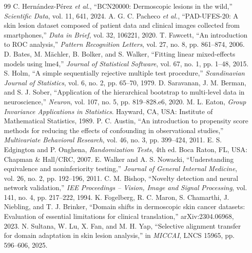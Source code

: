 \documentclass[11pt,a4paper]{article}
\begin{document}
\begin{thebibliography}{99}
 C. Hern\'andez-P\'erez \emph{et al.}, ``BCN20000: Dermoscopic lesions in the wild,'' \emph{Scientific Data}, vol. 11, 641, 2024.
 A. G. C. Pacheco \emph{et al.}, ``PAD-UFES-20: A skin lesion dataset composed of patient data and clinical images collected from smartphones,'' \emph{Data in Brief}, vol. 32, 106221, 2020.
 T. Fawcett, ``An introduction to ROC analysis,'' \emph{Pattern Recognition Letters}, vol. 27, no. 8, pp. 861--874, 2006.
 D. Bates, M. M\"achler, B. Bolker, and S. Walker, ``Fitting linear mixed-effects models using lme4,'' \emph{Journal of Statistical Software}, vol. 67, no. 1, pp. 1--48, 2015.
 S. Holm, ``A simple sequentially rejective multiple test procedure,'' \emph{Scandinavian Journal of Statistics}, vol. 6, no. 2, pp. 65--70, 1979.
 D. Saravanan, J. M. Berman, and S. J. Sober, ``Application of the hierarchical bootstrap to multi-level data in neuroscience,'' \emph{Neuron}, vol. 107, no. 5, pp. 819--828.e6, 2020.
 M. L. Eaton, \emph{Group Invariance Applications in Statistics}. Hayward, CA, USA: Institute of Mathematical Statistics, 1989.
 P. C. Austin, ``An introduction to propensity score methods for reducing the effects of confounding in observational studies,'' \emph{Multivariate Behavioral Research}, vol. 46, no. 3, pp. 399--424, 2011.
 E. S. Edgington and P. Onghena, \emph{Randomization Tests}, 4th ed. Boca Raton, FL, USA: Chapman \& Hall/CRC, 2007.
 E. Walker and A. S. Nowacki, ``Understanding equivalence and noninferiority testing,'' \emph{Journal of General Internal Medicine}, vol. 26, no. 2, pp. 192--196, 2011.
 C. M. Bishop, ``Novelty detection and neural network validation,'' \emph{IEE Proceedings -- Vision, Image and Signal Processing}, vol. 141, no. 4, pp. 217--222, 1994.
 K. Fogelberg, R. C. Maron, S. Chamarthi, J. Niebling, and T. J. Brinker, ``Domain shifts in dermoscopic skin cancer datasets: Evaluation of essential limitations for clinical translation,'' arXiv:2304.06968, 2023.
 N. Sultana, W. Lu, X. Fan, and M. H. Yap, ``Selective alignment transfer for domain adaptation in skin lesion analysis,'' in \emph{MICCAI}, LNCS 15965, pp. 596--606, 2025.
\end{thebibliography}
\end{document}
